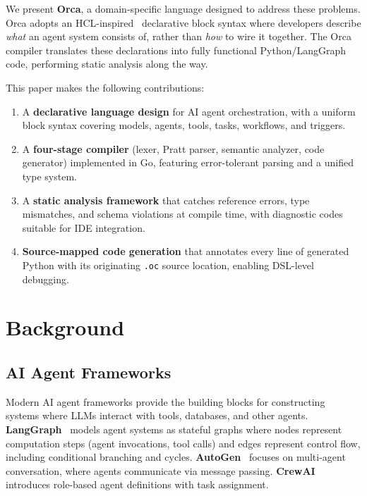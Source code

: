 \documentclass[sigconf,nonacm]{acmart}
\begin{document}
We present \textbf{Orca}, a domain-specific language designed to address
these problems. Orca adopts an HCL-inspired~\cite{terraform} declarative
block syntax where developers describe \emph{what} an agent system consists
of, rather than \emph{how} to wire it together. The Orca compiler translates
these declarations into fully functional Python/LangGraph code, performing
static analysis along the way.

This paper makes the following contributions:
\begin{enumerate}[leftmargin=*]
  \item A \textbf{declarative language design} for AI agent orchestration,
        with a uniform block syntax covering models, agents, tools, tasks,
        workflows, and triggers.
  \item A \textbf{four-stage compiler} (lexer, Pratt parser, semantic
        analyzer, code generator) implemented in Go, featuring error-tolerant
        parsing and a unified type system.
  \item A \textbf{static analysis framework} that catches reference errors,
        type mismatches, and schema violations at compile time, with
        diagnostic codes suitable for IDE integration.
  \item \textbf{Source-mapped code generation} that annotates every line of
        generated Python with its originating \texttt{.oc} source location,
        enabling DSL-level debugging.
\end{enumerate}

\section{Background}
\label{sec:background}

\subsection{AI Agent Frameworks}
\label{sec:background:frameworks}

Modern AI agent frameworks provide the building blocks for constructing
systems where LLMs interact with tools, databases, and other agents.
\textbf{LangGraph}~\cite{langgraph} models agent systems as stateful graphs
where nodes represent computation steps (agent invocations, tool calls) and
edges represent control flow, including conditional branching and cycles.
\textbf{AutoGen}~\cite{autogen} focuses on multi-agent conversation, where
agents communicate via message passing. \textbf{CrewAI}~\cite{crewai}
introduces role-based agent definitions with task assignment.
\end{document}
